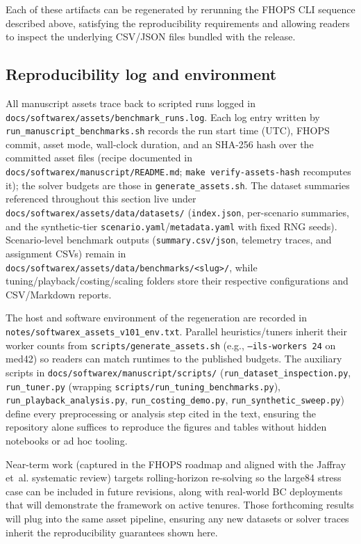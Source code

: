 Each of these artifacts can be regenerated by rerunning the FHOPS CLI sequence described above, satisfying the reproducibility requirements and allowing readers to inspect the underlying CSV/JSON files bundled with the release.

\subsection{Reproducibility log and environment}
All manuscript assets trace back to scripted runs logged in \texttt{docs/softwarex/assets/benchmark\_runs.log}. Each log entry written by \texttt{run\_manuscript\_benchmarks.sh} records the run start time (UTC), FHOPS commit, asset mode, wall-clock duration, and an SHA-256 hash over the committed asset files (recipe documented in \texttt{docs/softwarex/manuscript/README.md}; \texttt{make verify-assets-hash} recomputes it); the solver budgets are those in \texttt{generate\_assets.sh}. The dataset summaries referenced throughout this section live under \texttt{docs/softwarex/assets/data/datasets/} (\texttt{index.json}, per-scenario summaries, and the synthetic-tier \texttt{scenario.yaml}/\texttt{metadata.yaml} with fixed RNG seeds). Scenario-level benchmark outputs (\texttt{summary.csv/json}, telemetry traces, and assignment CSVs) remain in \texttt{docs/softwarex/assets/data/benchmarks/<slug>/}, while tuning/playback/costing/scaling folders store their respective configurations and CSV/Markdown reports.

The host and software environment of the regeneration are recorded in \texttt{notes/softwarex\_assets\_v101\_env.txt}. Parallel heuristics/tuners inherit their worker counts from \texttt{scripts/generate\_assets.sh} (e.g., \texttt{--ils-workers 24} on med42) so readers can match runtimes to the published budgets. The auxiliary scripts in \texttt{docs/softwarex/manuscript/scripts/} (\texttt{run\_dataset\_inspection.py}, \texttt{run\_tuner.py} (wrapping \texttt{scripts/run\_tuning\_benchmarks.py}), \texttt{run\_playback\_analysis.py}, \texttt{run\_costing\_demo.py}, \texttt{run\_synthetic\_sweep.py}) define every preprocessing or analysis step cited in the text, ensuring the repository alone suffices to reproduce the figures and tables without hidden notebooks or ad hoc tooling.

Near-term work (captured in the FHOPS roadmap and aligned with the Jaffray et~al. systematic review) targets rolling-horizon re-solving so the large84 stress case can be included in future revisions, along with real-world BC deployments that will demonstrate the framework on active tenures. Those forthcoming results will plug into the same asset pipeline, ensuring any new datasets or solver traces inherit the reproducibility guarantees shown here.
